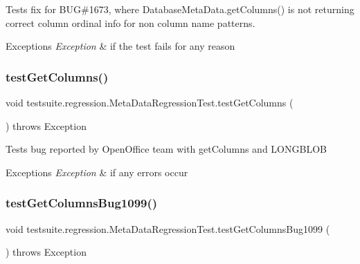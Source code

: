 Tests fix for B\+UG\#1673, where Database\+Meta\+Data.\+get\+Columns() is not returning correct column ordinal info for non \textquotesingle{}\textquotesingle{} column name patterns.


\begin{DoxyExceptions}{Exceptions}
{\em Exception} & if the test fails for any reason \\
\hline
\end{DoxyExceptions}
\mbox{\label{classtestsuite_1_1regression_1_1_meta_data_regression_test_a858c6ccbb86008517405f2e20ff56399}} 
\subsubsection{\texorpdfstring{test\+Get\+Columns()}{testGetColumns()}}
{\footnotesize\ttfamily void testsuite.\+regression.\+Meta\+Data\+Regression\+Test.\+test\+Get\+Columns (\begin{DoxyParamCaption}{ }\end{DoxyParamCaption}) throws Exception}

Tests bug reported by Open\+Office team with get\+Columns and L\+O\+N\+G\+B\+L\+OB


\begin{DoxyExceptions}{Exceptions}
{\em Exception} & if any errors occur \\
\hline
\end{DoxyExceptions}
\mbox{\label{classtestsuite_1_1regression_1_1_meta_data_regression_test_af4ecb86f35850a0a32d35dd22a705df0}} 
\subsubsection{\texorpdfstring{test\+Get\+Columns\+Bug1099()}{testGetColumnsBug1099()}}
{\footnotesize\ttfamily void testsuite.\+regression.\+Meta\+Data\+Regression\+Test.\+test\+Get\+Columns\+Bug1099 (\begin{DoxyParamCaption}{ }\end{DoxyParamCaption}) throws Exception}

